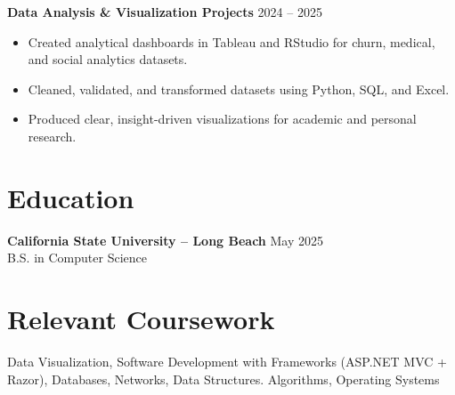 \documentclass[a4paper,10pt]{article}
\newcommand{\dateright}[1]{\hfill {\small\textnormal{#1}}}
\begin{document}
\textbf{Data Analysis \& Visualization Projects} \dateright{2024 – 2025}
\begin{itemize}
  \item Created analytical dashboards in Tableau and RStudio for churn, medical, and social analytics datasets.
  \item Cleaned, validated, and transformed datasets using Python, SQL, and Excel.
  \item Produced clear, insight-driven visualizations for academic and personal research.
\end{itemize}

\section*{Education}
\textbf{California State University – Long Beach} \dateright{May 2025}\\
B.S. in Computer Science

\section*{Relevant Coursework}
Data Visualization, Software Development with Frameworks (ASP.NET MVC + Razor), Databases, Networks, Data Structures. Algorithms, Operating Systems

\end{document}

